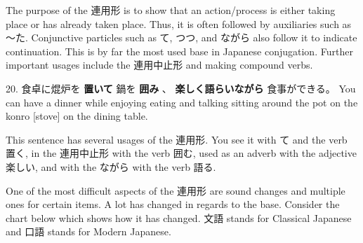 \par{ The purpose of the 連用形 is to show that an action\slash process is either taking place or has already taken place. Thus, it is often followed by auxiliaries such as ～た. Conjunctive particles such as て, つつ, and ながら also follow it to indicate continuation. This is by far the most used base in Japanese conjugation. Further important usages include the 連用中止形 and making compound verbs. }

\par{20. 食卓に焜炉を \textbf{置いて }鍋を \textbf{囲み }、 \textbf{楽しく語らいながら }食事ができる。 \hfill\break
You can have a dinner while enjoying eating and talking sitting around the pot on the konro [stove] on the dining table. }

\par{ This sentence has several usages of the 連用形. You see it with て and the verb 置く, in the 連用中止形 with the verb 囲む, used as an adverb with the adjective 楽しい, and with the ながら with the verb 語る. }

\par{ One of the most difficult aspects of the 連用形 are sound changes and multiple ones for certain items. A lot has changed in regards to the base. Consider the chart below which shows how it has changed. 文語 stands for Classical Japanese and 口語 stands for Modern Japanese. }
 
